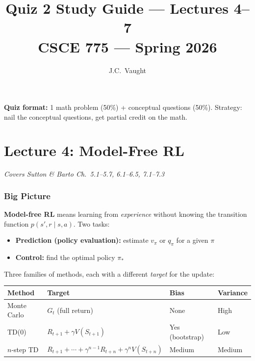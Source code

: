 \documentclass[11pt]{article}
\title{\color{garnet}\textbf{Quiz 2 Study Guide --- Lectures 4--7}\\[4pt]
\large CSCE 775 --- Spring 2026}
\author{J.C.\ Vaught}
\date{}
\newcommand{\concept}[1]{\textcolor{atlantic}{\textbf{#1}}}
\begin{document}
\maketitle
\thispagestyle{empty}

\textbf{Quiz format:} 1 math problem (50\%) + conceptual questions (50\%).
Strategy: nail the conceptual questions, get partial credit on the math.

\vspace{1em}

\part{Lecture 4: Model-Free RL}
\textit{Covers Sutton \& Barto Ch.\ 5.1--5.7, 6.1--6.5, 7.1--7.3}

\section{Big Picture}

\concept{Model-free RL} means learning from \textit{experience} without knowing the transition function $p(s',r \mid s,a)$. Two tasks:

\begin{itemize}[nosep]
    \item \textbf{Prediction (policy evaluation):} estimate $v_\pi$ or $q_\pi$ for a given $\pi$
    \item \textbf{Control:} find the optimal policy $\pi_*$
\end{itemize}

Three families of methods, each with a different \textit{target} for the update:

\begin{table}[H]
\centering
\begin{tabular}{llll}
\toprule
\textbf{Method} & \textbf{Target} & \textbf{Bias} & \textbf{Variance} \\
\midrule
Monte Carlo & $G_t$ (full return) & None & High \\
TD(0) & $R_{t+1} + \gamma V(S_{t+1})$ & Yes (bootstrap) & Low \\
$n$-step TD & $R_{t+1} + \cdots + \gamma^{n-1}R_{t+n} + \gamma^n V(S_{t+n})$ & Medium & Medium \\
\bottomrule
\end{tabular}
\end{table}
\end{document}
